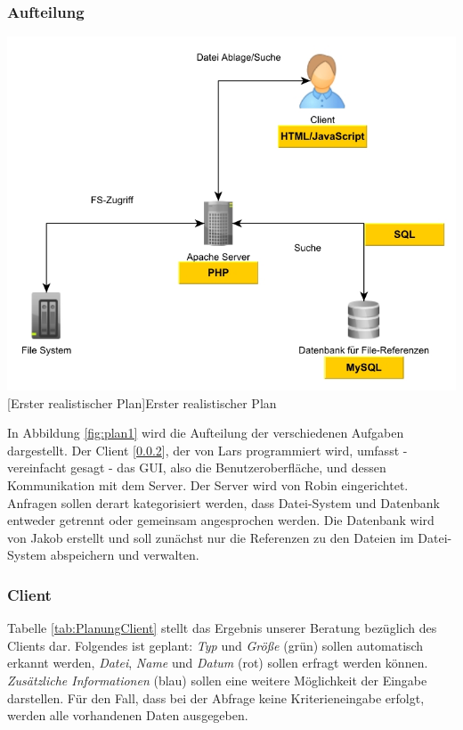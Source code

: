 \documentclass[12pt,a4paper,bibliography=totocnumbered,listof=totocnumbered]{scrartcl}
\begin{document}
\subsubsection{Aufteilung}
\label{sec:Aufteilung}

\vspace{1em}
\begin{minipage}{\linewidth}
	\centering
	\includegraphics[width=0.7\linewidth]{Bilder/Projekt-Entwurf.jpg}
	[Erster realistischer Plan]{Erster realistischer Plan}
	\label{fig:plan1}
\end{minipage}
\vspace{1em}

In Abbildung \ref{fig:plan1} wird die Aufteilung der verschiedenen Aufgaben dargestellt. Der Client [\ref{sec:Client / GUI}], der von Lars programmiert wird, umfasst - vereinfacht gesagt - das GUI, also die Benutzeroberfläche, und dessen Kommunikation mit dem Server. Der Server wird von Robin eingerichtet. Anfragen sollen derart kategorisiert werden, dass Datei-System und Datenbank entweder getrennt oder gemeinsam angesprochen werden. Die Datenbank wird von Jakob erstellt und soll zunächst nur die Referenzen zu den Dateien im Datei-System abspeichern und verwalten.\\

\subsubsection{Client}
\label{sec:Client / GUI}

Tabelle \ref{tab:PlanungClient} stellt das Ergebnis unserer Beratung bezüglich des Clients dar.
Folgendes ist geplant: \emph{Typ} und \emph{Größe} (grün) sollen automatisch erkannt werden, \emph{Datei}, \emph{Name} und \emph{Datum} (rot) sollen erfragt werden können. \emph{Zusätzliche Informationen} (blau) sollen eine weitere Möglichkeit der Eingabe darstellen. Für den Fall, dass bei der Abfrage keine Kriterieneingabe erfolgt, werden alle vorhandenen Daten ausgegeben.
\end{document}
